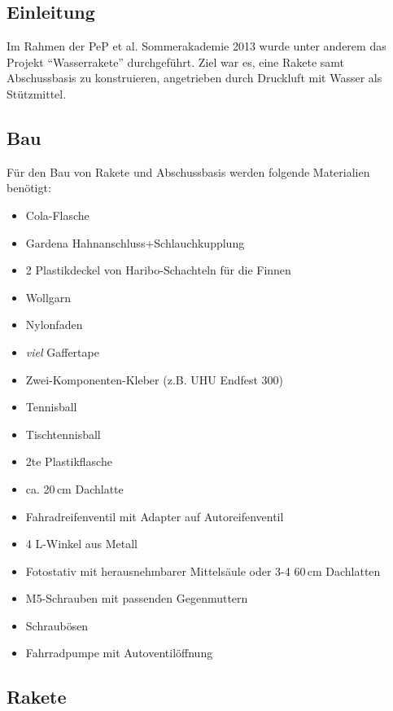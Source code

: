 \subsection{Einleitung}
Im Rahmen der PeP et al. Sommerakademie 2013 wurde unter anderem das Projekt \enquote{Wasserrakete} durchgeführt. Ziel war es, eine Rakete samt Abschussbasis zu konstruieren, angetrieben durch Druckluft mit Wasser als Stützmittel. 
\subsection{Bau}
Für den Bau von Rakete und Abschussbasis werden folgende Materialien benötigt:
\begin{itemize}
\item Cola-Flasche
\item Gardena Hahnanschluss+Schlauchkupplung
\item 2 Plastikdeckel von Haribo-Schachteln für die Finnen
\item Wollgarn
\item Nylonfaden
\item \emph{viel} Gaffertape
\item Zwei-Komponenten-Kleber (z.B. UHU Endfest 300)
\item Tennisball
\item Tischtennisball
\item 2te Plastikflasche
\item ca. 20\,cm Dachlatte
\item Fahradreifenventil mit Adapter auf Autoreifenventil
\item 4 L-Winkel aus Metall
\item Fotostativ mit herausnehmbarer Mittelsäule oder 3-4 60\,cm Dachlatten
\item M5-Schrauben mit passenden Gegenmuttern
\item Schraubösen
\item Fahrradpumpe mit Autoventilöffnung
\end{itemize}
\subsection{Rakete}

